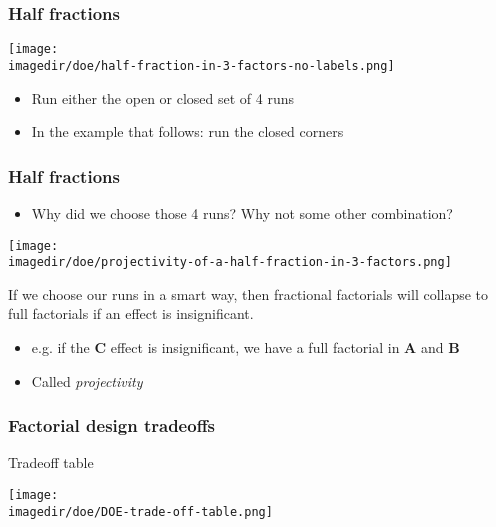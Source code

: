 \begin{frame}\frametitle{Half fractions}
	\begin{center}
		\texttt{[image: \\imagedir/doe/half-fraction-in-3-factors-no-labels.png]}
	\end{center}
	\begin{itemize}
		\item	Run either the open or closed set of 4 runs
		\item	In the example that follows: run the closed corners
	\end{itemize}
\end{frame}

\begin{frame}\frametitle{Half fractions}
	\begin{itemize}
		\item	Why did we choose those 4 runs? Why not some other combination?
	\end{itemize}
	\vspace{-6pt}
	\begin{center}
		\texttt{[image: \\imagedir/doe/projectivity-of-a-half-fraction-in-3-factors.png]}
	\end{center}
	If we choose our runs in a smart way, then fractional factorials will collapse to full factorials if an effect is insignificant.
	\begin{itemize}
		\item	e.g. if the \textbf{C} effect is insignificant, we have a full factorial in \textbf{A} and \textbf{B}
		\item	Called \emph{projectivity}
	\end{itemize}
\end{frame}

\begin{frame}\frametitle{Factorial design tradeoffs}

	Tradeoff table {}
	\begin{center}
		\texttt{[image: \\imagedir/doe/DOE-trade-off-table.png]}
	\end{center}
\end{frame}

